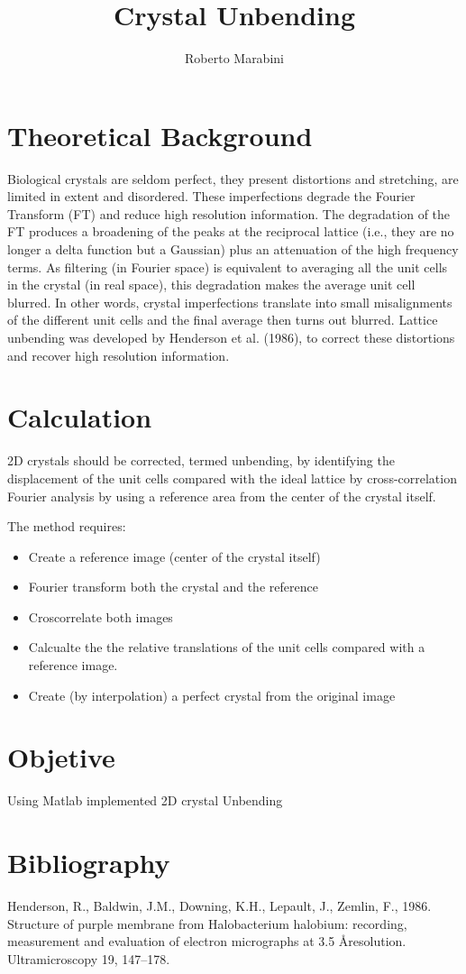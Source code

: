 \documentclass[a4paper,10pt]{article}
\title{Crystal Unbending}
\author{Roberto Marabini}
\date{}
\begin{document}
\maketitle

\section{Theoretical Background}

Biological crystals are seldom perfect, they present distortions
and stretching, are limited in extent and disordered.
These imperfections degrade the Fourier Transform (FT) and reduce
high resolution information. The degradation of the FT
produces a broadening of the peaks at the reciprocal lattice
(i.e., they are no longer a delta function but a Gaussian)
plus an attenuation of the high frequency terms. As filtering
(in Fourier space) is equivalent to averaging all the unit
cells in the crystal (in real space), this degradation makes
the average unit cell blurred. In other words, crystal imperfections
translate into small misalignments of the different
unit cells and the final average then turns out blurred.
Lattice unbending was developed by Henderson et al.
(1986), to correct these distortions and recover high resolution
information. 

\section {Calculation}

2D crystals should be corrected, termed unbending, by
identifying the displacement of the unit cells compared with the
ideal lattice by cross-correlation Fourier analysis by using a
reference area from the center of the crystal itself.

The method requires:
\begin{itemize}
 \item Create a reference image (center of the crystal itself)
 \item Fourier transform both the crystal and the reference
 \item Croscorrelate both images
 \item Calcualte the the relative translations of the unit cells compared with a reference image. 
 \item Create (by interpolation) a perfect crystal from the original image
\end{itemize}

\section {Objetive}
Using Matlab implemented 2D crystal Unbending

\section {Bibliography}
Henderson, R., Baldwin, J.M., Downing, K.H., Lepault, J., Zemlin, F.,
1986. Structure of purple membrane from Halobacterium halobium:
recording, measurement and evaluation of electron micrographs at
3.5  \AA resolution. Ultramicroscopy 19, 147–178.
\end{document}

